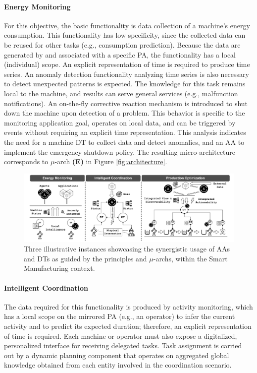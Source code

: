 \paragraph{Energy Monitoring}
For this objective, the basic functionality is data collection of a machine's energy consumption.
This functionality has low specificity, since the collected data can be reused for other tasks (e.g., consumption prediction).
Because the data are generated by and associated with a specific PA, the functionality has a local (individual) scope.
An explicit representation of time is required to produce time series.
%
An anomaly detection functionality analyzing time series is also necessary to detect unexpected patterns is expected.
The knowledge for this task remains local to the machine, and results can serve general services (e.g., malfunction notifications).
%
An on-the-fly corrective reaction mechanism is introduced to shut down the machine upon detection of a problem.
This behavior is specific to the monitoring application goal, operates on local data, and can be triggered by events without requiring an explicit time representation.
%
This analysis indicates the need for a machine DT to collect data and detect anomalies, and an AA to implement the emergency shutdown policy.
The resulting micro-architecture corresponds to $\mu$-arch \textbf{(E)} in Figure \ref{fig:architecture}.

\begin{figure}
    \centering
    \includegraphics[width=\columnwidth]{figures/dt-mas/dt_agents_zoom.pdf}
    \caption{Three  illustrative instances showcasing the synergistic usage of AAs and DTs as guided by the principles and $\mu$-archs, within the Smart Manufacturing context.}
    \label{fig:dt_agents_zoom}
\end{figure}

\paragraph{Intelligent Coordination}

The data required for this functionality is produced by activity monitoring, which has a local scope on the mirrored PA (e.g., an operator) to infer the current activity and to predict its expected duration; therefore, an explicit representation of time is required.
%
Each machine or operator must also expose a digitalized, personalized interface for receiving delegated tasks.
Task assignment is carried out by a dynamic planning component that operates on aggregated global knowledge obtained from each entity involved in the coordination scenario.


